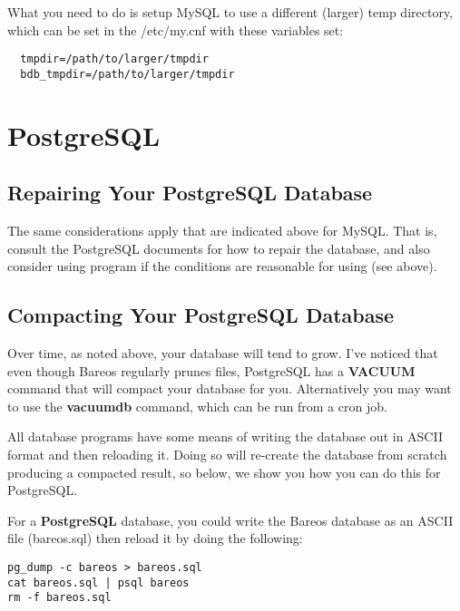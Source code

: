 What you need to do is setup MySQL to use a different (larger) temp
directory, which can be set in the /etc/my.cnf with these variables
set:

\footnotesize
\begin{verbatim}
  tmpdir=/path/to/larger/tmpdir
  bdb_tmpdir=/path/to/larger/tmpdir
\end{verbatim}
\normalsize

\section{PostgreSQL}

\label{RepairingPSQL}
\subsection{Repairing Your PostgreSQL Database}

The same considerations apply that are indicated above for MySQL. That is,
consult the PostgreSQL documents for how to repair the database, and also
consider using  program if the conditions are reasonable for
using (see above).

\subsection{Compacting Your PostgreSQL Database}
\label{CompactingPostgres}

Over time, as noted above, your database will tend to grow. I've noticed that
even though Bareos regularly prunes files, PostgreSQL has a {\bf VACUUM}
command that will compact your database for you. Alternatively you may want to
use the {\bf vacuumdb} command, which can be run from a cron job.

All database programs have some means of writing the database out in ASCII
format and then reloading it. Doing so will re-create the database from
scratch producing a compacted result, so below, we show you how you can do
this for PostgreSQL.

For a {\bf PostgreSQL} database, you could write the Bareos database as an
ASCII file (bareos.sql) then reload it by doing the following:

\footnotesize
\begin{verbatim}
pg_dump -c bareos > bareos.sql
cat bareos.sql | psql bareos
rm -f bareos.sql
\end{verbatim}
\normalsize


